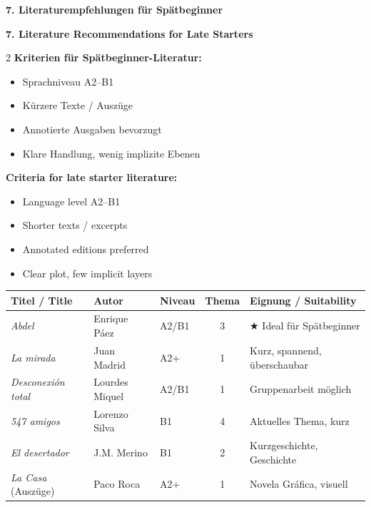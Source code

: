 \documentclass[10pt,a4paper]{article}
\newcommand{\secbil}[2]{%
\vspace{6pt}
\noindent\colorbox{spaet}{\parbox{0.48\textwidth}{\color{white}\bfseries\small #1}}%
\hfill%
\colorbox{english}{\parbox{0.48\textwidth}{\color{white}\bfseries\small #2}}
\vspace{3pt}
}
\begin{document}

\newpage

\secbil{7. Literaturempfehlungen für Spätbeginner}{7. Literature Recommendations for Late Starters}

\begin{paracol}{2}
\small
\textbf{Kriterien für Spätbeginner-Literatur:}
\begin{itemize}[noitemsep,topsep=2pt]
\item Sprachniveau A2--B1
\item Kürzere Texte / Auszüge
\item Annotierte Ausgaben bevorzugt
\item Klare Handlung, wenig implizite Ebenen
\end{itemize}

\switchcolumn

\small\color{english}
\textbf{Criteria for late starter literature:}
\begin{itemize}[noitemsep,topsep=2pt]
\item Language level A2--B1
\item Shorter texts / excerpts
\item Annotated editions preferred
\item Clear plot, few implicit layers
\end{itemize}

\end{paracol}

\vspace{2mm}

\begin{center}
\scriptsize
\begin{tabular}{|p{3.2cm}|p{2.5cm}|p{1.5cm}|c|p{3.5cm}|}
\hline
\rowcolor{lightgray}
\textbf{Titel / Title} & \textbf{Autor} & \textbf{Niveau} & \textbf{Thema} & \textbf{Eignung / Suitability} \\
\hline
\textit{Abdel} & Enrique Páez & A2/B1 & 3 & \textcolor{spaet}{$\bigstar$ Ideal für Spätbeginner} \\
\hline
\textit{La mirada} & Juan Madrid & A2+ & 1 & Kurz, spannend, überschaubar \\
\hline
\textit{Desconexión total} & Lourdes Miquel & A2/B1 & 1 & Gruppenarbeit möglich \\
\hline
\textit{547 amigos} & Lorenzo Silva & B1 & 4 & Aktuelles Thema, kurz \\
\hline
\textit{El desertador} & J.M. Merino & B1 & 2 & Kurzgeschichte, Geschichte \\
\hline
\textit{La Casa} (Auszüge) & Paco Roca & A2+ & 1 & Novela Gráfica, visuell \\
\hline
\end{tabular}
\end{center}
\end{document}
